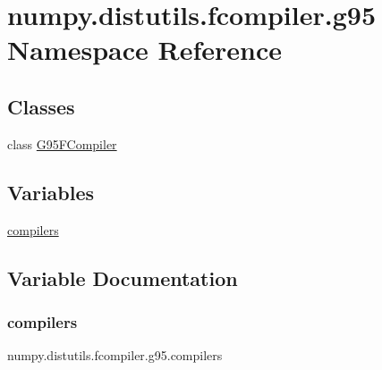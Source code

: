 \hypertarget{namespacenumpy_1_1distutils_1_1fcompiler_1_1g95}{}\section{numpy.\+distutils.\+fcompiler.\+g95 Namespace Reference}
\label{namespacenumpy_1_1distutils_1_1fcompiler_1_1g95}
\subsection*{Classes}
\begin{DoxyCompactItemize}
\item 
class \hyperlink{classnumpy_1_1distutils_1_1fcompiler_1_1g95_1_1G95FCompiler}{G95\+F\+Compiler}
\end{DoxyCompactItemize}
\subsection*{Variables}
\begin{DoxyCompactItemize}
\item 
\hyperlink{namespacenumpy_1_1distutils_1_1fcompiler_1_1g95_ab66e8df3e4d436b15a71b502112a1555}{compilers}
\end{DoxyCompactItemize}


\subsection{Variable Documentation}
\mbox{\label{namespacenumpy_1_1distutils_1_1fcompiler_1_1g95_ab66e8df3e4d436b15a71b502112a1555}} 
\subsubsection{\texorpdfstring{compilers}{compilers}}
{\footnotesize\ttfamily numpy.\+distutils.\+fcompiler.\+g95.\+compilers}

